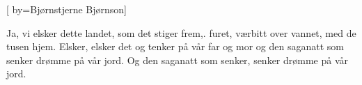 
[
by={Bjørnstjerne Bjørnson}]

\beginverse*
Ja, vi elsker dette landet,
som det stiger frem,.
furet, værbitt over vannet,
med de tusen hjem.
Elsker, elsker det og tenker
på vår far og mor
og den saganatt som senker
drømme på vår jord.
Og den saganatt som senker,
senker drømme på vår jord.
\endverse
\endsong


